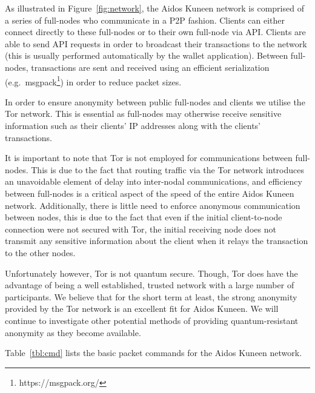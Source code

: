 \documentclass[a4paper,10pt,twocolumn]{article}
\begin{document}
As illustrated in Figure~\ref{fig:network}, the Aidos Kuneen network is comprised of a series of full-nodes who communicate in a P2P fashion. 
Clients can either connect directly to these full-nodes or to their own full-node via API\@. Clients are able to send API requests in order to broadcast their transactions to the network (this is usually performed automatically
by the wallet application). Between full-nodes, transactions are sent and received using an efficient serialization (e.g.\ msgpack\footnote{https://msgpack.org/}) in order to reduce packet sizes.

In order to ensure anonymity between public full-nodes and clients we utilise the Tor network. This is essential as full-nodes
may otherwise receive sensitive information such as their clients' IP addresses along with the clients' transactions.  

It is important to note that Tor is not employed for communications between full-nodes. This is due to the fact that routing traffic via the Tor network introduces an unavoidable element of delay into inter-nodal communications, and efficiency between full-nodes 
is a critical aspect of the speed of the entire Aidos Kuneen network. Additionally, there is little need to enforce anonymous communication between nodes, this is due to the fact that even if the initial client-to-node connection were not secured with Tor, the initial receiving node 
does not transmit any sensitive information about the client when it relays the transaction to the other nodes.

Unfortunately however, Tor is not quantum secure. Though, Tor does have the advantage of being a well established, trusted network with a large number of participants. We believe that for the short term at least, the strong anonymity provided 
by the Tor network is an excellent fit for Aidos Kuneen. We will continue to investigate other potential methods of providing quantum-resistant anonymity as they become available. 

Table~\ref{tbl:cmd} lists the basic packet commands for the Aidos Kuneen network.

\end{document}
